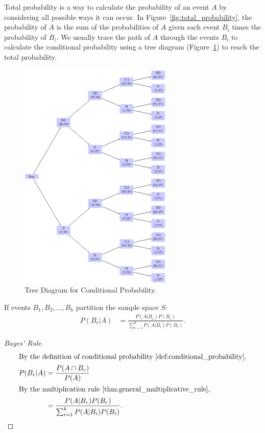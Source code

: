 \documentclass{article}
\begin{document}
Total probability is a way to calculate the probability of an event \( A \) by considering all possible ways it can occur. In Figure~\ref{fig:total_probability}, the probability of \( A \) is the sum of the probabilities of \( A \) given each event \( B_i \) times the probability of \( B_i \). We usually trace the path of \( A \) through the events \( B_i \) to calculate the conditional probability using a tree diagram (Figure~\ref{fig:tree_diagram}) to reach the total probability.

\begin{figure}[h]
    \centering
    \includegraphics[width=0.65\textwidth, angle=-90]{images/20250110_171731.png}
    \caption{Tree Diagram for Conditional Probability.}
    \label{fig:tree_diagram}
\end{figure}

\begin{theorem}
If events \( B_1, B_2, \ldots, B_k \) partition the sample space \( S \):
\begin{align}
    P(B_r|A) &= \frac{P(A|B_r)P(B_r)}{\sum_{i=1}^k P(A|B_i)P(B_i)}.
\end{align}
\end{theorem}

\begin{proof}[Bayes' Rule]
\begin{align*}
    \intertext{By the definition of conditional probability \ref{def:conditional_probability},}
    P(B_r|A) &= \frac{P(A \cap B_r)}{P(A)} \\
    \intertext{By the multiplication rule \ref{thm:general_multiplicative_rule},}
    &= \frac{P(A|B_r)P(B_r)}{\sum_{i=1}^k P(A|B_i)P(B_i)}.
\end{align*}
\end{proof}
\end{document}
